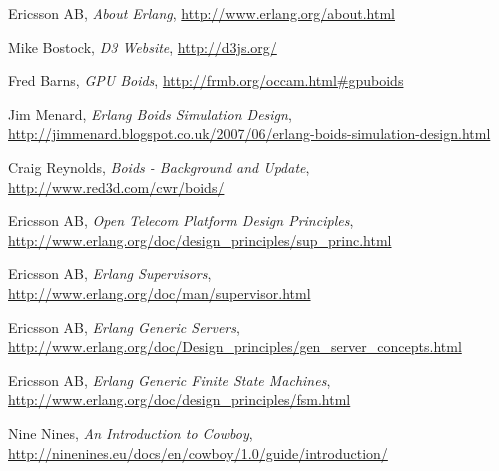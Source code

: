 \documentclass[10pt, a4paper, conference, compsocconf]{IEEEtran}
\begin{document}
%
%
%
\begin{thebibliography}{1}

    Ericsson AB,
    \emph{About Erlang},
    \url{http://www.erlang.org/about.html}

    Mike Bostock,
    \emph{D3 Website},
    \url{http://d3js.org/}

    Fred Barns,
    \emph{GPU Boids},
    \url{http://frmb.org/occam.html#gpuboids}

    Jim Menard,
    \emph{Erlang Boids Simulation Design},  \url{http://jimmenard.blogspot.co.uk/2007/06/erlang-boids-simulation-design.html}

    Craig Reynolds,
    \emph{Boids - Background and Update},
    \url{http://www.red3d.com/cwr/boids/}

    Ericsson AB,
	  \emph{Open Telecom Platform Design Principles},
    \url{http://www.erlang.org/doc/design_principles/sup_princ.html}

    Ericsson AB,
	  \emph{Erlang Supervisors},
    \url{http://www.erlang.org/doc/man/supervisor.html}

    Ericsson AB,
	  \emph{Erlang Generic Servers},
    \url{http://www.erlang.org/doc/Design_principles/gen_server_concepts.html}

    Ericsson AB,
	  \emph{Erlang Generic Finite State Machines},
    \url{http://www.erlang.org/doc/design_principles/fsm.html}

    Nine Nines,
    \emph{An Introduction to Cowboy},
    \url{http://ninenines.eu/docs/en/cowboy/1.0/guide/introduction/}

\end{thebibliography}

\end{document}
